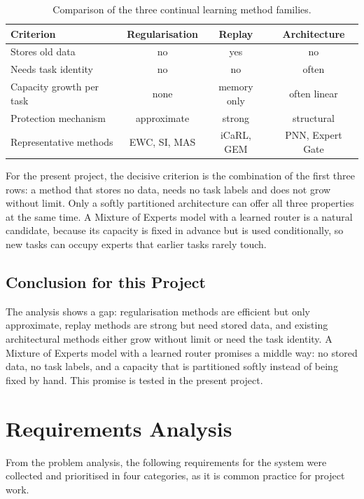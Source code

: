\begin{table}[H]
  \centering
  \small
  \caption{Comparison of the three continual learning method families.}
  \label{tab:families}
  \begin{tabular}{lccc}
    \toprule
    \textbf{Criterion} & \textbf{Regularisation} & \textbf{Replay} & \textbf{Architecture} \\
    \midrule
    Stores old data          & no   & yes  & no \\
    Needs task identity      & no   & no   & often \\
    Capacity growth per task & none & memory only & often linear \\
    Protection mechanism     & approximate & strong & structural \\
    Representative methods   & EWC, SI, MAS & iCaRL, GEM & PNN, Expert Gate \\
    \bottomrule
  \end{tabular}
\end{table}

For the present project, the decisive criterion is the combination of the
first three rows: a method that stores no data, needs no task labels and
does not grow without limit. Only a softly partitioned architecture can
offer all three properties at the same time. A Mixture of Experts model
with a learned router is a natural candidate, because its capacity is
fixed in advance but is used conditionally, so new tasks can occupy experts
that earlier tasks rarely touch.

\subsection{Conclusion for this Project}

The analysis shows a gap: regularisation methods are efficient but only
approximate, replay methods are strong but need stored data, and existing
architectural methods either grow without limit or need the task identity.
A Mixture of Experts model with a learned router promises a middle way: no
stored data, no task labels, and a capacity that is partitioned softly
instead of being fixed by hand. This promise is tested in the present
project.

\section{Requirements Analysis}
\label{sec:requirements}

From the problem analysis, the following requirements for the system were
collected and prioritised in four categories, as it is common practice for
project work.

